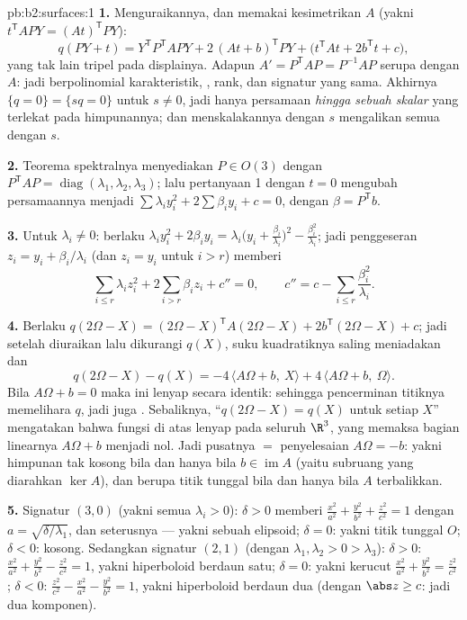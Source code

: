 \begin{solution}{pb:b2:surfaces:1}
\textbf{1.} Menguraikannya, dan memakai kesimetrikan $A$
(yakni $t^{\mathsf T}\!APY = (At)^{\mathsf T}PY$):
\[
q(PY + t) = Y^{\mathsf T}P^{\mathsf T}\!APY +
2\,(At + b)^{\mathsf T}PY + \bigl(t^{\mathsf T}\!At +
2b^{\mathsf T}t + c\bigr),
\]
yang tak lain tripel pada displainya. Adapun $A' = P^{\mathsf T}\!AP =
P^{-1}AP$ serupa dengan $A$: jadi berpolinomial karakteristik,
, rank, dan signatur yang sama. Akhirnya $\{q = 0\} = \{sq = 0\}$
untuk $s \neq 0$, jadi hanya persamaan \emph{hingga sebuah skalar} yang
terlekat pada himpunannya; dan menskalakannya dengan $s$ mengalikan semua 
dengan $s$.

\textbf{2.} Teorema spektralnya menyediakan $P \in O(3)$ dengan
$P^{\mathsf T}\!AP = \operatorname{diag}(\lambda_1, \lambda_2,
\lambda_3)$; lalu pertanyaan 1 dengan $t = 0$ mengubah persamaannya menjadi
$\sum\lambda_iy_i^2 + 2\sum\beta_iy_i + c = 0$, dengan $\beta =
P^{\mathsf T}b$.

\textbf{3.} Untuk $\lambda_i \neq 0$: berlaku $\lambda_iy_i^2 +
2\beta_iy_i = \lambda_i\bigl(y_i +
\frac{\beta_i}{\lambda_i}\bigr)^2 -
\frac{\beta_i^2}{\lambda_i}$; jadi penggeseran $z_i = y_i +
\beta_i/\lambda_i$ (dan $z_i = y_i$ untuk $i > r$) memberi
\[
\sum_{i \leq r}\lambda_iz_i^2 + 2\sum_{i > r}\beta_iz_i +
c'' = 0, \qquad
c'' = c - \sum_{i\leq r}\frac{\beta_i^2}{\lambda_i}.
\]

\textbf{4.} Berlaku $q(2\Omega - X) = (2\Omega - X)^{\mathsf T}
A(2\Omega - X) + 2b^{\mathsf T}(2\Omega - X) + c$; jadi setelah diuraikan
lalu dikurangi $q(X)$, suku kuadratiknya saling meniadakan dan
\[
q(2\Omega - X) - q(X) = -4\,\langle A\Omega + b,\ X\rangle +
4\,\langle A\Omega + b,\ \Omega\rangle .
\]
Bila $A\Omega + b = 0$ maka ini lenyap secara identik: sehingga pencerminan
titiknya memelihara $q$, jadi juga . Sebaliknya,
``$q(2\Omega - X) = q(X)$ untuk setiap $X$'' mengatakan bahwa fungsi 
di atas lenyap pada seluruh $\R^3$, yang memaksa bagian
linearnya $A\Omega + b$ menjadi nol. Jadi pusatnya $=$ penyelesaian
$A\Omega = -b$: yakni himpunan tak kosong bila dan hanya bila $b \in \operatorname{im}A$
(yaitu subruang  yang diarahkan $\ker A$), dan berupa titik tunggal
bila dan hanya bila $A$ terbalikkan.

\textbf{5.} Signatur $(3,0)$ (yakni semua $\lambda_i > 0$): $\delta >
0$ memberi $\frac{x^2}{a^2} + \frac{y^2}{b^2} + \frac{z^2}{c^2}
= 1$ dengan $a = \sqrt{\delta/\lambda_1}$, dan seterusnya --- yakni sebuah
elipsoid; $\delta = 0$: yakni titik tunggal $O$; $\delta < 0$:
kosong. Sedangkan signatur $(2,1)$ (dengan $\lambda_1, \lambda_2 > 0 >
\lambda_3$): $\delta > 0$: $\frac{x^2}{a^2} + \frac{y^2}{b^2}
- \frac{z^2}{c^2} = 1$, yakni hiperboloid berdaun satu; $\delta =
0$: yakni kerucut $\frac{x^2}{a^2} + \frac{y^2}{b^2} =
\frac{z^2}{c^2}$; $\delta < 0$: $\frac{z^2}{c^2} -
\frac{x^2}{a^2} - \frac{y^2}{b^2} = 1$, yakni hiperboloid berdaun
dua (dengan $\abs z \geq c$: jadi dua komponen).


\end{solution}
